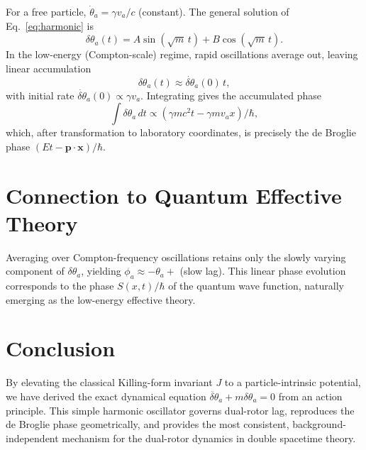 \documentclass[dvipdfmx,11pt,a4paper]{article}
\begin{document}
For a free particle, $\dot{\theta}_a = \gamma v_a/c$ (constant). The general solution of Eq.~\eqref{eq:harmonic} is
\[
\delta\theta_a(t) = A \sin(\sqrt{m}\, t) + B \cos(\sqrt{m}\, t).
\]
In the low-energy (Compton-scale) regime, rapid oscillations average out, leaving linear accumulation
\[
\delta\theta_a(t) \approx \dot{\delta\theta}_a(0)\, t,
\]
with initial rate $\dot{\delta\theta}_a(0) \propto \gamma v_a$. Integrating gives the accumulated phase
\[
\int \delta\theta_a\, dt \propto (\gamma m c^2 t - \gamma m v_a x)/\hbar,
\]
which, after transformation to laboratory coordinates, is precisely the de Broglie phase $(Et - \mathbf{p}\cdot\mathbf{x})/\hbar$.

\section{Connection to Quantum Effective Theory}

Averaging over Compton-frequency oscillations retains only the slowly varying component of $\delta\theta_a$, yielding $\phi_a \approx -\theta_a +$ (slow lag). This linear phase evolution corresponds to the phase $S(x,t)/\hbar$ of the quantum wave function, naturally emerging as the low-energy effective theory.

\section{Conclusion}

By elevating the classical Killing-form invariant $J$ to a particle-intrinsic potential, we have derived the exact dynamical equation $\ddot{\delta\theta}_a + m \delta\theta_a = 0$ from an action principle. This simple harmonic oscillator governs dual-rotor lag, reproduces the de Broglie phase geometrically, and provides the most consistent, background-independent mechanism for the dual-rotor dynamics in double spacetime theory.
\end{document}
